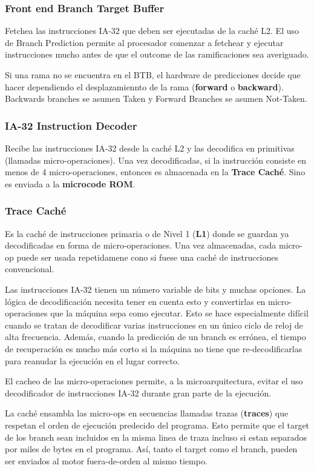 \subsubsection*{Front end Branch Target Buffer}\label{sec::Intel::Netburst::frontEnd::btb}
Fetchea las instrucciones IA-32 que deben ser ejecutadas de la caché L2. El uso de Branch Prediction permite al procesador comenzar a fetchear y ejecutar instrucciones mucho antes de que el outcome de las ramificaciones sea averiguado.
	
Si una rama no se encuentra en el BTB, el hardware de predicciones decide que hacer dependiendo el desplazamiennto de la rama (\textbf{forward} o \textbf{backward}). Backwards branches se asumen Taken y Forward Branches se asumen Not-Taken.

\subsubsection*{IA-32 Instruction Decoder}
Recibe las instrucciones IA-32 desde la caché L2 y las decodifica en primitivas (llamadas micro-operaciones). Una vez decodificadas, si la instrucción consiste en menos de 4 micro-operaciones, entonces es almacenada en la \textbf{Trace Caché}. Sino es enviada a la \textbf{microcode ROM}.

\subsubsection*{Trace Caché} 
Es la caché de instrucciones primaria o de Nivel 1 (\textbf{L1}) donde se guardan ya decodificadas en forma de micro-operaciones. Una vez almacenadas, cada micro-op puede ser usada repetidamene cono si fuese una caché de instrucciones convencional.

Las instrucciones IA-32 tienen un número variable de bits y muchas opciones. La lógica de decodificación necesita tener en cuenta esto y convertirlas en micro-operaciones que la máquina sepa como ejecutar. Esto se hace especialmente difícil cuando se tratan de decodificar varias instrucciones en un único ciclo de reloj de alta frecuencia. Además, cuando la predicción de un branch es errónea, el tiempo de recuperación es mucho más corto si la máquina no tiene que re-decodificarlas para reanudar la ejecución en el lugar correcto.
	
El cacheo de las micro-operaciones permite, a la microarquitectura, evitar el uso decodificador de instrucciones IA-32 durante gran parte de la ejecución.

La caché ensambla las micro-ops en secuencias llamadas trazas (\textbf{traces}) que respetan el orden de ejecución predecido del programa. Esto permite que el target de los branch sean incluidos en la misma linea de traza incluso si estan separados por miles de bytes en el programa. Así, tanto el target como el branch, pueden ser enviados al motor fuera-de-orden al mismo tiempo.

